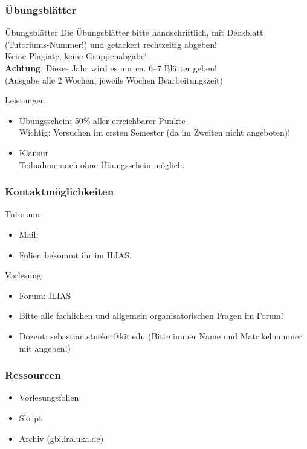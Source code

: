 \begin{frame}
	\frametitle{Übungsblätter}
	
	\begin{block}{Übungsblätter}
		Die Übungsblätter bitte handschriftlich, mit Deckblatt (Tutoriums-Nummer!) und getackert rechtzeitig	abgeben! \\ \pause
		Keine Plagiate, keine Gruppenabgabe! \\[1em] \pause
		\textbf{Achtung}: Dieses Jahr wird es nur ca. 6--7 Blätter geben! \\
		(Ausgabe alle 2 Wochen, jeweils  Wochen Bearbeitungszeit) 
	\end{block}
	\pause
	\begin{block}{Leistungen}
		\begin{itemize}
			\item Übungsschein: 50\% aller erreichbarer Punkte \\
				  Wichtig: Versuchen im ersten Semester (da im Zweiten nicht angeboten)!
			\item Klausur \\
				  Teilnahme auch ohne Übungsschein möglich.
		\end{itemize}
	\end{block}
\end{frame}

\begin{frame}
	\frametitle{Kontaktmöglichkeiten}
	
	\begin{block}{Tutorium}
		\begin{itemize}
			\item Mail: \mymail
			\item Folien bekommt ihr im ILIAS.
		\end{itemize} 
	\end{block}
	\pause
	
	\begin{block}{Vorlesung}
		\begin{itemize}
			\item Forum: ILIAS
			\item Bitte alle fachlichen und allgemein organisatorischen Fragen im Forum!
			\item Dozent: sebastian.stueker@kit.edu (Bitte immer Name und Matrikelnummer mit angeben!)
		\end{itemize}
	\end{block}
\end{frame}

\begin{frame}
	\frametitle{Ressourcen}
	
	\begin{itemize}
		\item Vorlesungsfolien
		\item Skript
		\item Archiv (gbi.ira.uka.de)
	\end{itemize}
	
\end{frame}


